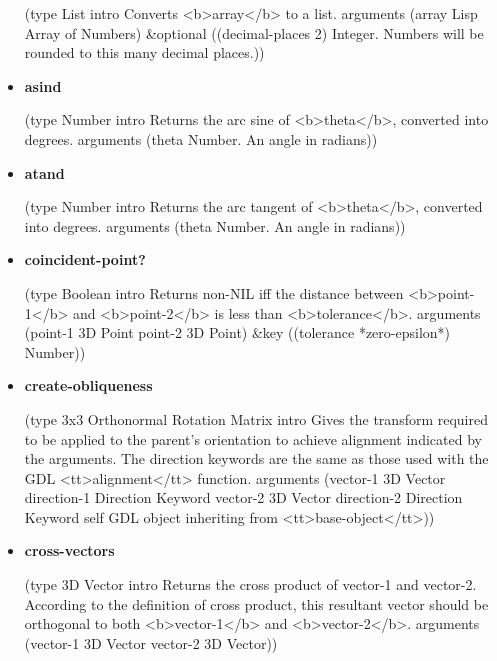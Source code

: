 \documentclass [11pt]{book}
\begin{document}
\begin{itemize}
(type List intro  Converts <b>array</b> to a list.
 arguments (array Lisp Array of Numbers) \&optional
 ((decimal-places 2)
  Integer. Numbers will be rounded to this many decimal places.))



\item {}
\label{prim:asind}
\textbf{asind}

(type Number intro
  Returns the arc sine of <b>theta</b>, converted into degrees.
 arguments (theta Number. An angle in radians))



\item {}
\label{prim:atand}
\textbf{atand}

(type Number intro
  Returns the arc tangent of <b>theta</b>, converted into degrees.
 arguments (theta Number. An angle in radians))



\item {}
\label{prim:coincident-point?}
\textbf{coincident-point?}

(type Boolean intro
  Returns non-NIL iff the distance between <b>point-1</b> and <b>point-2</b>
is less than <b>tolerance</b>.
 arguments (point-1 3D Point point-2 3D Point) \&key
 ((tolerance *zero-epsilon*) Number))



\item {}
\label{prim:create-obliqueness}
\textbf{create-obliqueness}

(type 3x3 Orthonormal Rotation Matrix intro
  Gives the transform required
to be applied to the parent's orientation to achieve alignment
indicated by the arguments. The direction keywords are the same
as those used with the GDL <tt>alignment</tt> function.
 arguments
 (vector-1 3D Vector direction-1 Direction Keyword vector-2 3D Vector
  direction-2 Direction Keyword self
  GDL object inheriting from <tt>base-object</tt>))



\item {}
\label{prim:cross-vectors}
\textbf{cross-vectors}

(type 3D Vector intro
  Returns the cross product of vector-1 and vector-2. According to
the definition of cross product, this resultant vector should be orthogonal
to both <b>vector-1</b> and <b>vector-2</b>.
 arguments (vector-1 3D Vector vector-2 3D Vector))




\end{itemize}
\end{document}
